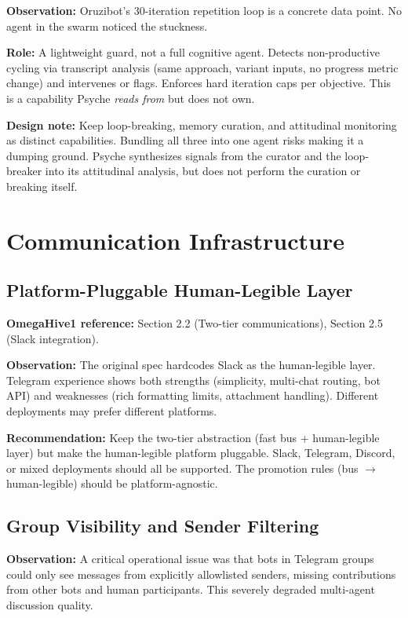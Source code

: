 \documentclass[11pt,a4paper]{article}
\begin{document}
\textbf{Observation:} Oruzibot's 30-iteration repetition loop is a
concrete data point. No agent in the swarm noticed the stuckness.

\textbf{Role:} A lightweight guard, not a full cognitive agent. Detects
non-productive cycling via transcript analysis (same approach, variant
inputs, no progress metric change) and intervenes or flags. Enforces
hard iteration caps per objective. This is a capability Psyche
\emph{reads from} but does not own.

\textbf{Design note:} Keep loop-breaking, memory curation, and
attitudinal monitoring as distinct capabilities. Bundling all three
into one agent risks making it a dumping ground. Psyche synthesizes
signals from the curator and the loop-breaker into its attitudinal
analysis, but does not perform the curation or breaking itself.

\section{Communication Infrastructure}

\subsection{Platform-Pluggable Human-Legible Layer}
\label{sec:comms-platform}

\textbf{OmegaHive1 reference:} Section 2.2 (Two-tier communications), Section 2.5 (Slack integration).

\textbf{Observation:} The original spec hardcodes Slack as the
human-legible layer. Telegram experience shows both strengths (simplicity,
multi-chat routing, bot API) and weaknesses (rich formatting limits,
attachment handling). Different deployments may prefer different platforms.

\textbf{Recommendation:} Keep the two-tier abstraction (fast bus +
human-legible layer) but make the human-legible platform pluggable.
Slack, Telegram, Discord, or mixed deployments should all be supported.
The promotion rules (bus $\to$ human-legible) should be platform-agnostic.

\subsection{Group Visibility and Sender Filtering}
\label{sec:group-visibility}

\textbf{Observation:} A critical operational issue was that bots in
Telegram groups could only see messages from explicitly allowlisted
senders, missing contributions from other bots and human participants.
This severely degraded multi-agent discussion quality.
\end{document}
